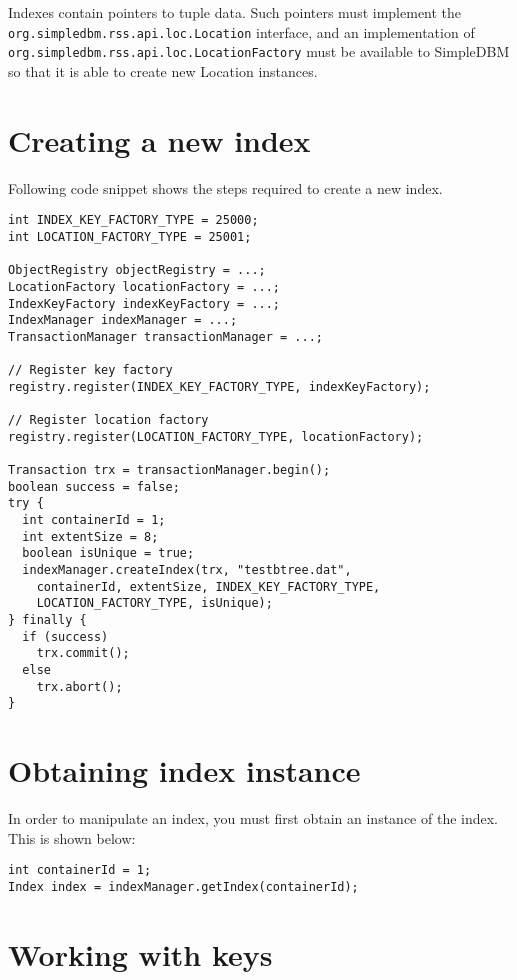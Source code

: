 \documentclass[a4paper,draft,oneside]{book}
\begin{document}
Indexes contain pointers to tuple data. Such pointers must implement the
\verb|org.simpledbm.rss.api.loc.Location| interface, and an implementation of
\verb|org.simpledbm.rss.api.loc.LocationFactory| must be available to SimpleDBM so that
it is able to create new Location instances.

\section{Creating a new index}

Following code snippet shows the steps required to create a new
index.

\begin{verbatim}
int INDEX_KEY_FACTORY_TYPE = 25000;
int LOCATION_FACTORY_TYPE = 25001;

ObjectRegistry objectRegistry = ...;
LocationFactory locationFactory = ...;
IndexKeyFactory indexKeyFactory = ...;
IndexManager indexManager = ...;
TransactionManager transactionManager = ...;

// Register key factory
registry.register(INDEX_KEY_FACTORY_TYPE, indexKeyFactory);

// Register location factory
registry.register(LOCATION_FACTORY_TYPE, locationFactory);

Transaction trx = transactionManager.begin();
boolean success = false;
try {
  int containerId = 1;
  int extentSize = 8;
  boolean isUnique = true;
  indexManager.createIndex(trx, "testbtree.dat", 
    containerId, extentSize, INDEX_KEY_FACTORY_TYPE, 
    LOCATION_FACTORY_TYPE, isUnique);
} finally {
  if (success)
    trx.commit();
  else
    trx.abort();
}
\end{verbatim}

\section{Obtaining index instance}

In order to manipulate an index, you must first obtain an instance of the
index. This is shown below:

\begin{verbatim}
int containerId = 1;
Index index = indexManager.getIndex(containerId);
\end{verbatim}

\section{Working with keys}
\end{document}

